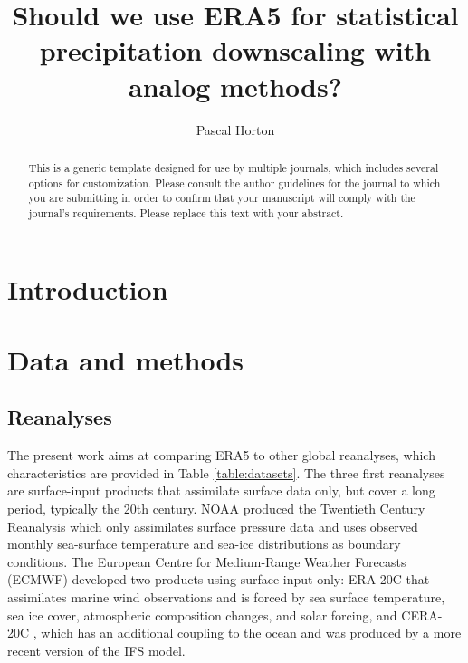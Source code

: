 \documentclass[alpha-refs]{wiley-article}
\title{Should we use ERA5 for statistical precipitation downscaling with analog methods?}
\author[1]{Pascal Horton}
\affil[1]{Oeschger Centre for Climate Change Research and Institute of Geography, University of Bern, Bern, Switzerland}
\begin{document}
\maketitle

\begin{abstract}
This is a generic template designed for use by multiple journals, which includes several options for customization. Please consult the author guidelines for the journal to which you are submitting in order to confirm that your manuscript will comply with the journal's requirements. Please replace this text with your abstract.

\end{abstract}

\section{Introduction}

\section{Data and methods}

\subsection{Reanalyses}

The present work aims at comparing ERA5 \citep{Hersbach2019} to other global reanalyses, which characteristics are provided in Table \ref{table:datasets}. The three first reanalyses are surface-input \citep{Fujiwara2017} products that assimilate surface data only, but cover a long period, typically the 20th century. NOAA produced the Twentieth Century Reanalysis \citep[version 2c, 20CR-2c --][]{Compo2011} which only assimilates surface pressure data and uses observed monthly sea-surface temperature and sea-ice distributions as boundary conditions. The European Centre for Medium-Range Weather Forecasts (ECMWF) developed two products using surface input only: ERA-20C \citep{Poli2016} that assimilates marine wind observations and is forced by sea surface temperature, sea ice cover, atmospheric composition changes, and solar forcing, and CERA-20C \citep{Laloyaux2018a}, which has an additional coupling to the ocean and was produced by a more recent version of the IFS model.
\end{document}
